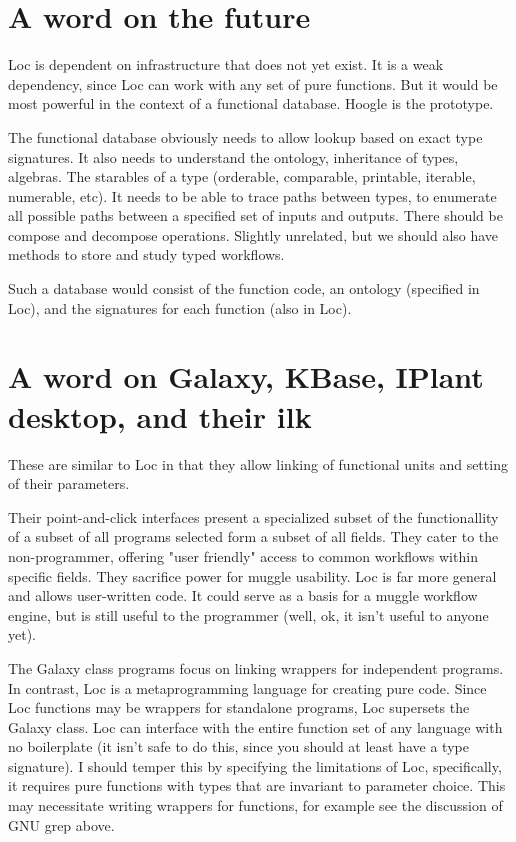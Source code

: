 \documentclass[12pt]{article}
\begin{document}
\section{A word on the future}

Loc is dependent on infrastructure that does not yet exist. It is a weak
dependency, since Loc can work with any set of pure functions. But it would be
most powerful in the context of a functional database. Hoogle is the prototype.

The functional database obviously needs to allow lookup based on exact type
signatures. It also needs to understand the ontology, inheritance of types,
algebras. The starables of a type (orderable, comparable, printable, iterable,
numerable, etc). It needs to be able to trace paths between types, to enumerate
all possible paths between a specified set of inputs and outputs. There should
be compose and decompose operations. Slightly unrelated, but we should also
have methods to store and study typed workflows.

Such a database would consist of the function code, an ontology (specified in
Loc), and the signatures for each function (also in Loc).

\section{A word on Galaxy, KBase, IPlant desktop, and their ilk}

These are similar to Loc in that they allow linking of functional units and
setting of their parameters.

Their point-and-click interfaces present a specialized subset of the
functionallity of a subset of all programs selected form a subset of all
fields. They cater to the non-programmer, offering "user friendly" access to
common workflows within specific fields. They sacrifice power for muggle
usability. Loc is far more general and allows user-written code. It could serve
as a basis for a muggle workflow engine, but is still useful to the programmer
(well, ok, it isn't useful to anyone yet).

The Galaxy class programs focus on linking wrappers for independent programs.
In contrast, Loc is a metaprogramming language for creating pure code. Since
Loc functions may be wrappers for standalone programs, Loc supersets the Galaxy
class. Loc can interface with the entire function set of any language with no
boilerplate (it isn't safe to do this, since you should at least have a type
signature). I should temper this by specifying the limitations of Loc,
specifically, it requires pure functions with types that are invariant to
parameter choice. This may necessitate writing wrappers for functions, for
example see the discussion of GNU grep above.
\end{document}
